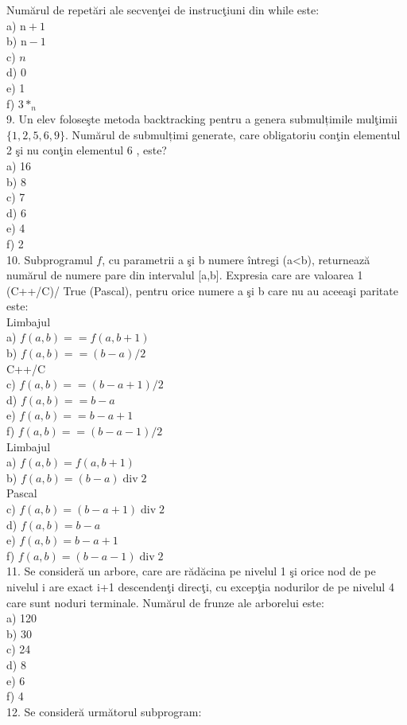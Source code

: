 Numărul de repetări ale secvenţei de instrucţiuni din while este:\\
a) $\mathrm{n}+1$\\
b) $\mathrm{n}-1$\\
c) $n$\\
d) 0\\
e) 1\\
f) $3 *_{n}$\\
9. Un elev foloseşte metoda backtracking pentru a genera submulțimile mulţimii $\{1,2,5,6,9\}$. Numărul de submulțimi generate, care obligatoriu conţin elementul 2 şi nu conţin elementul 6 , este?\\
a) 16\\
b) 8\\
c) 7\\
d) 6\\
e) 4\\
f) 2\\
10. Subprogramul $f$, cu parametrii a şi b numere întregi (a<b), returnează numărul de numere pare din intervalul [a,b]. Expresia care are valoarea 1 (C++/C)/ True (Pascal), pentru orice numere a şi b care nu au aceeaşi paritate este:\\
Limbajul\\
a) $f(a, b)==f(a, b+1)$\\
b) $f(a, b)==(b-a) / 2$\\
C++/C\\
c) $f(a, b)==(b-a+1) / 2$\\
d) $f(a, b)==b-a$\\
e) $f(a, b)==b-a+1$\\
f) $f(a, b)==(b-a-1) / 2$\\
Limbajul\\
a) $f(a, b)=f(a, b+1)$\\
b) $f(a, b)=(b-a) \operatorname{div} 2$\\
Pascal\\
c) $f(a, b)=(b-a+1) \operatorname{div} 2$\\
d) $f(a, b)=b-a$\\
e) $f(a, b)=b-a+1$\\
f) $f(a, b)=(b-a-1) \operatorname{div} 2$\\
11. Se consideră un arbore, care are rădăcina pe nivelul 1 şi orice nod de pe nivelul i are exact i+1 descendenţi direcţi, cu excepţia nodurilor de pe nivelul 4 care sunt noduri terminale. Numărul de frunze ale arborelui este:\\
a) 120\\
b) 30\\
c) 24\\
d) 8\\
e) 6\\
f) 4\\
12. Se consideră următorul subprogram:

